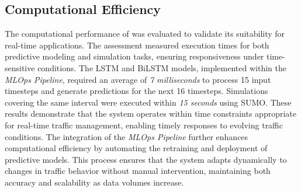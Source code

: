\subsection{Computational Efficiency}  

The computational performance of \digit was evaluated to validate its suitability for real-time applications. The assessment measured execution times for both predictive modeling and simulation tasks, ensuring responsiveness under time-sensitive conditions. The LSTM and BiLSTM models, implemented within the \textit{MLOps Pipeline}, required an average of \textit{7 milliseconds} to process 15 input timesteps and generate predictions for the next 16 timesteps. Simulations covering the same interval were executed within \textit{15 seconds} using SUMO. These results demonstrate that the system operates within time constraints appropriate for real-time traffic management, enabling timely responses to evolving traffic conditions. The integration of the \textit{MLOps Pipeline} further enhances computational efficiency by automating the retraining and deployment of predictive models. This process ensures that the system adapts dynamically to changes in traffic behavior without manual intervention, maintaining both accuracy and scalability as data volumes increase.

